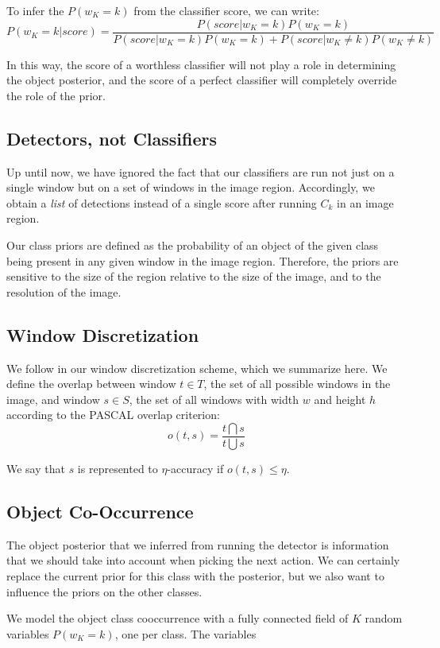 To infer the $P(w_K=k)$ from the classifier score, we can write:
\[
P(w_K=k|score) = \frac{P(score|w_K=k)P(w_K=k)}{P(score|w_K=k)P(w_K=k)+P(score|w_K \neq k)P(w_K \neq k)}
\]

In this way, the score of a worthless classifier will not play a role in determining the object posterior, and the score of a perfect classifier will completely override the role of the prior.

\subsection{Detectors, not Classifiers}
Up until now, we have ignored the fact that our classifiers are run not just on a single window but on a set of windows in the image region.
Accordingly, we obtain a \emph{list} of detections instead of a single score after running $C_k$ in an image region.

Our class priors are defined as the probability of an object of the given class being present in any given window in the image region.
Therefore, the priors are sensitive to the size of the region relative to the size of the image, and to the resolution of the image.


\subsection{Window Discretization}
We follow \cite{Zhang2011} in our window discretization scheme, which we summarize here.
We define the overlap between window $t \in T$, the set of all possible windows in the image, and window $s \in S$, the set of all windows with width $w$ and height $h$ according to the PASCAL overlap criterion:
\begin{equation}
o(t,s) = \frac{t \bigcap s}{t \bigcup s}
\end{equation}

We say that $s$ is represented to $\eta$-accuracy if $o(t,s) \leq \eta$. 

\subsection{Object Co-Occurrence}
The object posterior that we inferred from running the detector is information that we should take into account when picking the next action.
We can certainly replace the current prior for this class with the posterior, but we also want to influence the priors on the other classes.

We model the object class cooccurrence with a fully connected field of $K$ random variables $P(w_K=k)$, one per class.
The variables 



